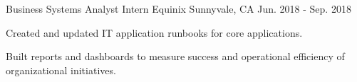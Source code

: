 \begin{cventries}
  \cventry
    {Business Systems Analyst Intern} %
    {Equinix} %
    {Sunnyvale, CA} %
    {Jun. 2018 - Sep. 2018} %
    {
      \begin{cvitems} %
        \item {Created and updated IT application runbooks for core applications.}
        \item {Built reports and dashboards to measure success and operational efficiency of organizational initiatives.}
      \end{cvitems}
    }

\end{cventries}
